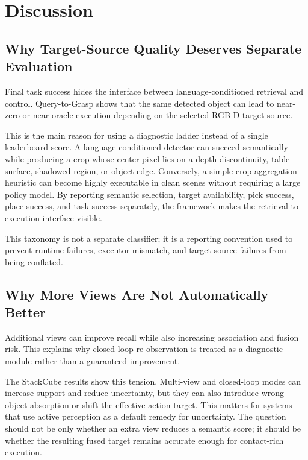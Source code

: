 \documentclass[preprint,12pt]{elsarticle}
\begin{document}
\section{Discussion}

\subsection{Why Target-Source Quality Deserves Separate Evaluation}

Final task success hides the interface between language-conditioned retrieval
and control. Query-to-Grasp shows that the same detected object can lead to
near-zero or near-oracle execution depending on the selected RGB-D target
source.

This is the main reason for using a diagnostic ladder instead of a single
leaderboard score. A language-conditioned detector can succeed semantically
while producing a crop whose center pixel lies on a depth discontinuity, table
surface, shadowed region, or object edge. Conversely, a simple crop aggregation
heuristic can become highly executable in clean scenes without requiring a
large policy model. By reporting semantic selection, target availability, pick
success, place success, and task success separately, the framework makes the
retrieval-to-execution interface visible.

This taxonomy is not a separate classifier; it is a reporting convention used
to prevent runtime failures, executor mismatch, and target-source failures from
being conflated.



\subsection{Why More Views Are Not Automatically Better}

Additional views can improve recall while also increasing association and
fusion risk. This explains why closed-loop re-observation is treated as a
diagnostic module rather than a guaranteed improvement.

The StackCube results show this tension. Multi-view and closed-loop modes can
increase support and reduce uncertainty, but they can also introduce wrong
object absorption or shift the effective action target. This matters for
systems that use active perception as a default remedy for uncertainty. The
question should not be only whether an extra view reduces a semantic score; it
should be whether the resulting fused target remains accurate enough for
contact-rich execution.
\end{document}
